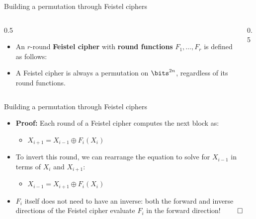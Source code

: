 \ifdefined\PRESENTATION\else\PassOptionsToClass{handout}{beamer}\fi\documentclass[aspectratio=169, lualatex]{beamer}
\begin{document}
\begin{frame}{Building a permutation through Feistel ciphers}
	\begin{columns}[c]
		\begin{column}{0.5\textwidth}
			\begin{itemize}
				\item An $r$-round \textbf{Feistel cipher} with \textbf{round functions} $F_1,\ldots,F_r$ is defined as follows:\\
				      \begin{center}
				      \end{center}
				\item A Feistel cipher is always a permutation on $\bits^{2n}$, regardless of its round functions.
			\end{itemize}
		\end{column}
		\begin{column}{0.5\textwidth}
		\end{column}
	\end{columns}
\end{frame}

\begin{frame}{Building a permutation through Feistel ciphers}
	\begin{itemize}
		\item \textbf{Proof:} Each round of a Feistel cipher computes the next block as:
		      \begin{itemize}
			      \item $X_{i+1} = X_{i-1} \oplus F_{i}(X_{i})$
		      \end{itemize}
		\item To invert this round, we can rearrange the equation to solve for $X_{i-1}$ in terms of $X_{i}$ and $X_{i+1}$:
		      \begin{itemize}
			      \item $X_{i-1} = X_{i+1} \oplus F_{i}(X_{i})$
		      \end{itemize}
		\item $F_i$ itself does not need to have an inverse: both the forward and inverse directions of the Feistel cipher evaluate $F_i$ in the forward direction! $\qed$
	\end{itemize}
\end{frame}
\end{document}
